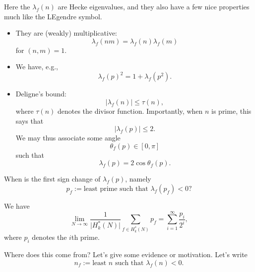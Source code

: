 \documentclass[reqno]{amsart} 
\begin{document}
Here the $\lambda_f (n) $ are Hecke eigenvalues, and they also have a few nice properties much like the LEgendre symbol.
\begin{itemize}
\item They are (weakly) multiplicative:
  \begin{equation*}
    \lambda_f (n m ) = \lambda_f (n) \lambda_f (m)
  \end{equation*}
  for $(n, m ) = 1$.
\item We have, e.g.,
  \begin{equation*}
    \lambda_f (p)^2 = 1 + \lambda_f (p^2 ).
  \end{equation*}
\item Deligne's bound:
  \begin{equation*}
    \lvert \lambda_f (n)  \rvert \leq \tau (n),
  \end{equation*}
  where $\tau (n)$ denotes the divisor function.  Importantly, when $n$ is prime, this says that
  \begin{equation*}
    \lvert \lambda_f (p) \rvert \leq 2.
  \end{equation*}
  We may thus associate some angle
  \begin{equation*}
    \theta_f (p) \in [0, \pi ]
  \end{equation*}
  such that
  \begin{equation*}
    \lambda_f (p) = 2 \cos \theta_f (p).
  \end{equation*}
\end{itemize}
\begin{question}
  When is the first sign change of $\lambda_f (p)$, namely
  \begin{equation*}
    p_f := \text{least prime such that } \lambda_f (p_f ) < 0?
  \end{equation*}
\end{question}
\begin{theorem}[V]
  We have
  \begin{equation*}
    \lim_{N \rightarrow \infty } \frac{1 }{ \lvert H_k^\ast (N)  \rvert}
    \sum_{f \in H_k^\ast (N) } p_f
    = \sum_{i = 1 }^\infty
    \frac{p_i }{ 2^i },
  \end{equation*}
  where $p_i $ denotes the $i$th prime.
\end{theorem}
Where does this come from?  Let's give some evidence or motivation.  Let's write
\begin{equation*}
  n_f := \text{least $n$ such that } \lambda_f (n) < 0.
\end{equation*}
\end{document}
